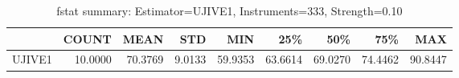 \begin{table}[ht]
\centering
\caption{fstat summary: Estimator=UJIVE1, Instruments=333, Strength=0.10}
\begin{tabular}{lrrrrrrrr}
\toprule
 & COUNT & MEAN & STD & MIN & 25\% & 50\% & 75\% & MAX \\
\midrule
UJIVE1 & 10.0000 & 70.3769 & 9.0133 & 59.9353 & 63.6614 & 69.0270 & 74.4462 & 90.8447 \\
\bottomrule
\end{tabular}
\end{table}
